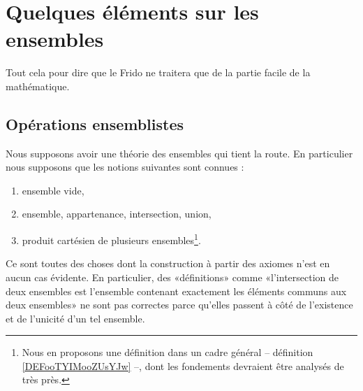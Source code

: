 \section{Quelques éléments sur les ensembles}
\label{SECooEltsEnsembles}

\begin{normaltext}	\label{NORMooFridoMathsFaciles}
	Tout cela pour dire que le Frido ne traitera que de la partie facile de la mathématique.
\end{normaltext}

\subsection{Opérations ensemblistes}
\label{SUBooOperationsEnsemblistes}

\begin{normaltext}\label{NorooFridoIntro2}
	Nous supposons avoir une théorie des ensembles qui tient la route. En particulier nous supposons que les notions suivantes sont connues :
	\begin{enumerate}
		\item
		      ensemble vide,
		\item
		      ensemble, appartenance, intersection, union,
		\item
		      produit cartésien de plusieurs ensembles\footnote{Nous en proposons une définition dans un cadre général -- définition \ref{DEFooTYIMooZUsYJw} --, dont les fondements devraient être analysés de très près.}.
	\end{enumerate}
	Ce sont toutes des choses dont la construction à partir des axiomes n'est en aucun cas évidente. En particulier, des «définitions» comme «l'intersection de deux ensembles est l'ensemble contenant exactement les éléments communs aux deux ensembles» ne sont pas correctes parce qu'elles passent à côté de l'existence et de l'unicité d'un tel ensemble.
\end{normaltext}

